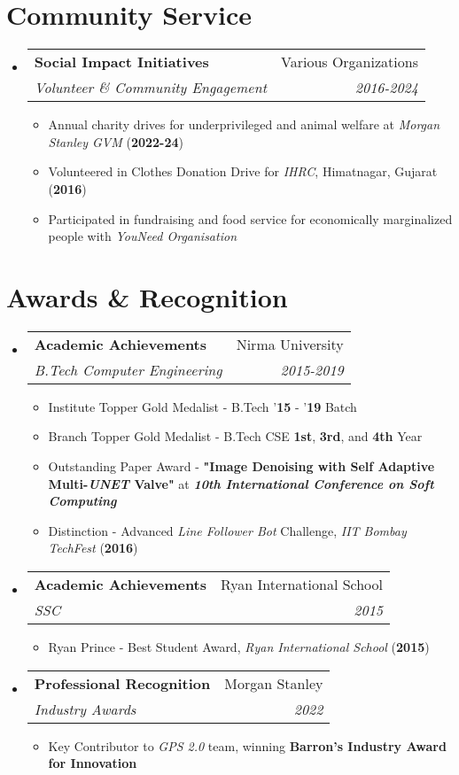 \documentclass[letterpaper,11pt]{article}
\makeatletter
\newcommand{\resumeItem}[1]{
  \item\small{
    {#1 \vspace{-2pt}}
  }
}
\newcommand{\resumeSubheading}[4]{
  \vspace{-2pt}\item
    \begin{tabular*}{0.97\textwidth}[t]{l@{\extracolsep{\fill}}r}
      \textbf{#1} & #2 \\
      \textit{\small#3} & \textit{\small #4} \\
    \end{tabular*}\vspace{-7pt}
}
\newcommand{\resumeSubHeadingListStart}{\begin{itemize}[leftmargin=0.15in, label={}]}
\newcommand{\resumeSubHeadingListEnd}{\end{itemize}}
\newcommand{\resumeItemListStart}{\begin{itemize}}
\newcommand{\resumeItemListEnd}{\end{itemize}\vspace{-5pt}}
\makeatother
\begin{document}
\section{Community Service}
\resumeSubHeadingListStart
    \resumeSubheading
    {Social Impact Initiatives}{Various Organizations}
    {Volunteer \& Community Engagement}{2016-2024}
    \resumeItemListStart
        \resumeItem{Annual charity drives for underprivileged and animal welfare at \textit{Morgan Stanley GVM} (\textbf{2022-24})}
        \resumeItem{Volunteered in Clothes Donation Drive for \textit{IHRC}, Himatnagar, Gujarat (\textbf{2016})}
        \resumeItem{Participated in fundraising and food service for economically marginalized people with \textit{YouNeed Organisation}}
    \resumeItemListEnd
\resumeSubHeadingListEnd

\section{Awards \& Recognition}
\resumeSubHeadingListStart
    \resumeSubheading
    {Academic Achievements}{Nirma University}
    {B.Tech Computer Engineering}{2015-2019}
    \resumeItemListStart
        \resumeItem{Institute Topper Gold Medalist - B.Tech '\textbf{15} - '\textbf{19} Batch}
        \resumeItem{Branch Topper Gold Medalist - B.Tech CSE \textbf{1st}, \textbf{3rd}, and \textbf{4th} Year}
        \resumeItem{Outstanding Paper Award - \textbf{"Image Denoising with Self Adaptive Multi-\textit{UNET} Valve"} at \textit{\textbf{10th International Conference on Soft Computing}}}
        \resumeItem{Distinction - Advanced \textit{Line Follower Bot} Challenge, \textit{IIT Bombay TechFest} (\textbf{2016})}
    \resumeItemListEnd
\resumeSubheading
    {Academic Achievements}{Ryan International School}{SSC}
    {2015}
    \resumeItemListStart
    \resumeItem{Ryan Prince - Best Student Award, \textit{Ryan International School} (\textbf{2015})}
    \resumeItemListEnd
    \resumeSubheading
    {Professional Recognition}{Morgan Stanley}
    {Industry Awards}{2022}
    \resumeItemListStart
        \resumeItem{Key Contributor to \textit{GPS 2.0} team, winning \textbf{Barron's Industry Award for Innovation}}
    \resumeItemListEnd
\resumeSubHeadingListEnd

\end{document}
